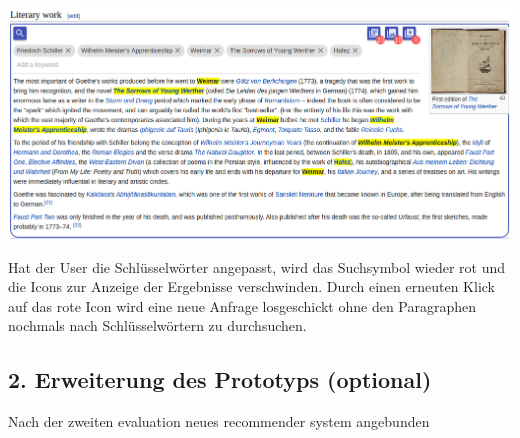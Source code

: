  \begin{minipage}{\linewidth}
	\centering
	\vspace*{0.5cm}
	\includegraphics[width=\linewidth]{Bilder/app-screenshots/keywords_v2.png}
	\label{fig:keywords_v2}
	\vspace*{0.5cm}
 \end{minipage}

 Hat der User die Schlüsselwörter angepasst, wird das Suchsymbol wieder rot und die Icons zur Anzeige der Ergebnisse verschwinden. Durch einen erneuten Klick auf das rote Icon wird eine neue Anfrage losgeschickt ohne den Paragraphen nochmals nach Schlüsselwörtern zu durchsuchen.

 \subsection{2. Erweiterung des Prototyps (optional)}
 Nach der zweiten evaluation neues recommender system angebunden